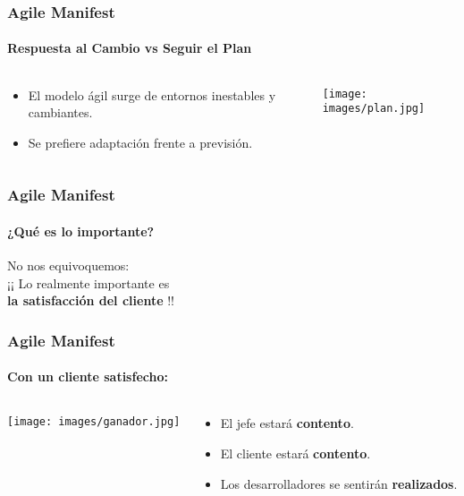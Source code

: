 {  \begin{frame}
   \frametitle{Agile Manifest}
   \framesubtitle{Respuesta al Cambio vs Seguir el Plan}

   \begin{columns}
    \begin{column}{7cm}
     \begin{itemize}
      \item El modelo ágil surge de entornos inestables y cambiantes.
      \item Se prefiere adaptación frente a previsión.
     \end{itemize}
    \end{column}
    \begin{column}{4cm}
     \texttt{[image: images/plan.jpg]}
    \end{column}
   \end{columns}

  \end{frame}

  \begin{frame}
   \frametitle{Agile Manifest}
   \framesubtitle{¿Qué es lo importante?}

   \begin{center}
    No nos equivoquemos:\\
    ¡¡ Lo realmente importante es \\[1pc]
    \textbf{\Large la satisfacción del cliente} !!
   \end{center}
  \end{frame}


  \begin{frame}
   \frametitle{Agile Manifest}
   \framesubtitle{Con un cliente satisfecho:}

    \begin{columns}
     \begin{column}{4cm}
      \texttt{[image: images/ganador.jpg]}
     \end{column}
     \begin{column}{6cm}
      \begin{itemize}
       \item El jefe estará \textbf{contento}.
       \item El cliente estará \textbf{contento}.
       \item Los desarrolladores se sentirán \textbf{realizados}.
      \end{itemize}
     \end{column}
    \end{columns}


\end{frame}}
